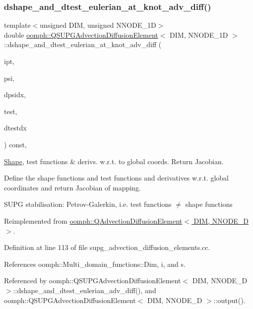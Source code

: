 \subsubsection{\texorpdfstring{dshape\+\_\+and\+\_\+dtest\+\_\+eulerian\+\_\+at\+\_\+knot\+\_\+adv\+\_\+diff()}{dshape\_and\_dtest\_eulerian\_at\_knot\_adv\_diff()}}
{\footnotesize\ttfamily template$<$unsigned D\+IM, unsigned N\+N\+O\+D\+E\+\_\+1D$>$ \\
double \hyperlink{classoomph_1_1QSUPGAdvectionDiffusionElement}{oomph\+::\+Q\+S\+U\+P\+G\+Advection\+Diffusion\+Element}$<$ D\+IM, N\+N\+O\+D\+E\+\_\+1D $>$\+::dshape\+\_\+and\+\_\+dtest\+\_\+eulerian\+\_\+at\+\_\+knot\+\_\+adv\+\_\+diff (\begin{DoxyParamCaption}\item[{const unsigned \&}]{ipt,  }\item[{\hyperlink{classoomph_1_1Shape}{Shape} \&}]{psi,  }\item[{\hyperlink{classoomph_1_1DShape}{D\+Shape} \&}]{dpsidx,  }\item[{\hyperlink{classoomph_1_1Shape}{Shape} \&}]{test,  }\item[{\hyperlink{classoomph_1_1DShape}{D\+Shape} \&}]{dtestdx }\end{DoxyParamCaption}) const\hspace{0.3cm}{\ttfamily [protected]}, {\ttfamily [virtual]}}



\hyperlink{classoomph_1_1Shape}{Shape}, test functions \& derivs. w.\+r.\+t. to global coords. Return Jacobian. 

Define the shape functions and test functions and derivatives w.\+r.\+t. global coordinates and return Jacobian of mapping.

S\+U\+PG stabilisation\+: Petrov-\/\+Galerkin, i.\+e. test functions $ \ne $ shape functions 

Reimplemented from \hyperlink{classoomph_1_1QAdvectionDiffusionElement_afc66bf00b79622cc6580787b9d86f215}{oomph\+::\+Q\+Advection\+Diffusion\+Element$<$ D\+I\+M, N\+N\+O\+D\+E\+\_\+D $>$}.



Definition at line 113 of file supg\+\_\+advection\+\_\+diffusion\+\_\+elements.\+cc.



References oomph\+::\+Multi\+\_\+domain\+\_\+functions\+::\+Dim, i, and s.



Referenced by oomph\+::\+Q\+S\+U\+P\+G\+Advection\+Diffusion\+Element$<$ D\+I\+M, N\+N\+O\+D\+E\+\_\+D $>$\+::dshape\+\_\+and\+\_\+dtest\+\_\+eulerian\+\_\+adv\+\_\+diff(), and oomph\+::\+Q\+S\+U\+P\+G\+Advection\+Diffusion\+Element$<$ D\+I\+M, N\+N\+O\+D\+E\+\_\+D $>$\+::output().

